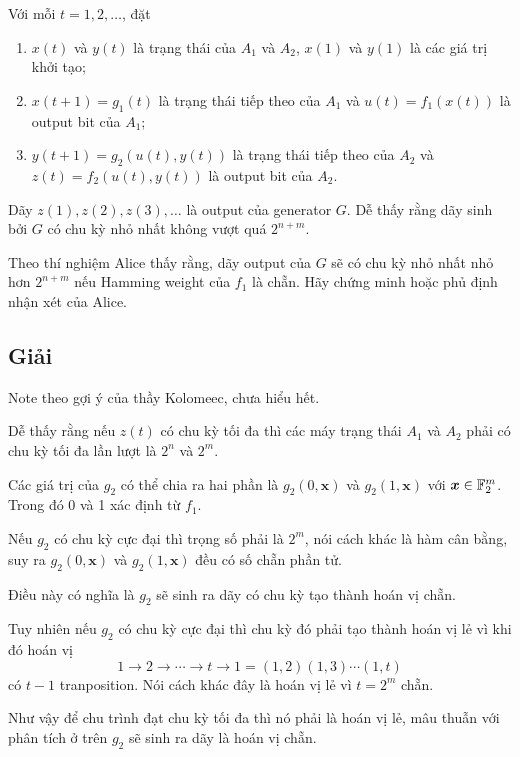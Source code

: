 Với mỗi $t=1, 2, \ldots$, đặt

\begin{enumerate}
    \item $x(t)$ và $y(t)$ là trạng thái của $A_1$ và $A_2$, $x(1)$ và $y(1)$ là các giá trị khởi tạo;
    \item $x(t+1) = g_1 (t)$ là trạng thái tiếp theo của $A_1$ và $u(t) = f_1 (x(t))$ là output bit của $A_1$;
    \item $y(t+1) = g_2(u(t), y(t))$ là trạng thái tiếp theo của $A_2$ và $z(t) = f_2(u(t), y(t))$ là output bit của $A_2$.
\end{enumerate}

Dãy $z(1), z(2), z(3), \ldots$ là output của generator $G$. Dễ thấy rằng dãy sinh bởi $G$ có chu kỳ nhỏ nhất không vượt quá $2^{n+m}$.

Theo thí nghiệm Alice thấy rằng, dãy output của $G$ sẽ có chu kỳ nhỏ nhất nhỏ hơn $2^{n+m}$ nếu Hamming weight của $f_1$ là chẵn. Hãy chứng minh hoặc phủ định nhận xét của Alice.

\subsection*{Giải}

Note theo gợi ý của thầy Kolomeec, chưa hiểu hết.

Dễ thấy rằng nếu $z(t)$ có chu kỳ tối đa thì các máy trạng thái $A_1$ và $A_2$ phải có chu kỳ tối đa lần lượt là $2^n$ và $2^m$.

Các giá trị của $g_2$ có thể chia ra hai phần là $g_2(0, \bm{x})$ và $g_2(1, \bm{x})$ với $\bm{x} \in \mathbb{F}_2^m$. Trong đó 0 và 1 xác định từ $f_1$.

Nếu $g_2$ có chu kỳ cực đại thì trọng số phải là $2^{m}$, nói cách khác là hàm cân bằng, suy ra $g_2(0, \bm{x})$ và $g_2(1, \bm{x})$ đều có số chẵn phần tử.

Điều này có nghĩa là $g_2$ sẽ sinh ra dãy có chu kỳ tạo thành hoán vị chẵn.

Tuy nhiên nếu $g_2$ có chu kỳ cực đại thì chu kỳ đó phải tạo thành hoán vị lẻ vì khi đó hoán vị
\begin{equation*}
    1 \to 2 \to \cdots \to t \to 1 = (1, 2) (1, 3) \cdots (1, t)
\end{equation*}
có $t - 1$ tranposition. Nói cách khác đây là hoán vị lẻ vì $t=2^{m}$ chẵn.

Như vậy để chu trình đạt chu kỳ tối đa thì nó phải là hoán vị lẻ, mâu thuẫn với phân tích ở trên $g_2$ sẽ sinh ra dãy là hoán vị chẵn.

